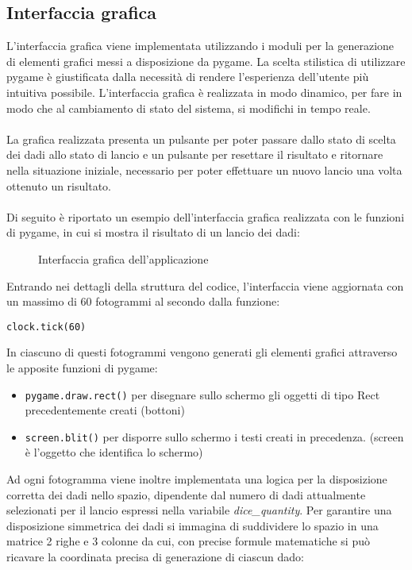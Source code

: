 \subsection{Interfaccia grafica}
L'interfaccia grafica viene implementata utilizzando i moduli per la generazione di elementi grafici messi a disposizione da pygame.
La scelta stilistica di utilizzare pygame è giustificata dalla necessità di rendere l'esperienza dell'utente più intuitiva possibile.
L'interfaccia grafica è realizzata in modo dinamico, per fare in modo che al cambiamento di stato del sistema, si modifichi in tempo reale.
\\\\La grafica realizzata presenta un pulsante per poter passare dallo stato di scelta dei dadi allo stato di lancio e un pulsante per resettare il risultato
e ritornare nella situazione iniziale, necessario per poter effettuare un nuovo lancio una volta ottenuto un risultato.
\\\\Di seguito è riportato un esempio dell'interfaccia grafica realizzata con le funzioni di pygame, in cui si mostra il risultato di un lancio dei dadi:
\begin{figure}[H]
    \centering
    \caption{Interfaccia grafica dell'applicazione}
    \label{fig:RollStateON3}
\end{figure}
Entrando nei dettagli della struttura del codice, l'interfaccia viene aggiornata con un massimo di 60 fotogrammi al secondo dalla funzione:
\begin{verbatim}
clock.tick(60)
\end{verbatim}
In ciascuno di questi fotogrammi vengono generati gli elementi grafici attraverso le apposite funzioni di pygame:
\begin{itemize}
    \item \Verb#pygame.draw.rect()# per disegnare sullo schermo gli oggetti di tipo Rect precedentemente creati (bottoni)
    \item \Verb#screen.blit()# per disporre sullo schermo i testi creati in precedenza. (screen è l'oggetto che identifica lo schermo)
\end{itemize}
Ad ogni fotogramma viene inoltre implementata una logica per la disposizione corretta dei dadi nello spazio, dipendente dal numero di dadi attualmente
selezionati per il lancio espressi nella variabile \textit{dice\_quantity}. Per garantire una disposizione simmetrica dei dadi si immagina di
suddividere lo spazio in una matrice 2 righe e 3 colonne da cui, con precise formule matematiche si può ricavare la coordinata precisa di generazione di ciascun dado:
